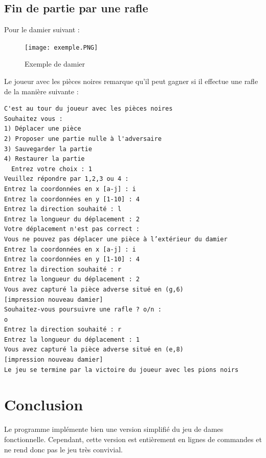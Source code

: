 \documentclass{article}
\begin{document}
\subsection{Fin de partie par une rafle}
Pour le damier suivant :
\begin{figure}[H]
\begin{center}
\texttt{[image: exemple.PNG]}
\end{center}
\caption{Exemple de damier}
\label{Exemple de damier}
\end{figure}
Le joueur avec les pièces noires remarque qu'il peut gagner si il effectue une rafle de la manière suivante :
\begin{verbatim}
C'est au tour du joueur avec les pièces noires 
Souhaitez vous :
1) Déplacer une pièce 
2) Proposer une partie nulle à l'adversaire
3) Sauvegarder la partie 
4) Restaurer la partie
  Entrez votre choix : 1
Veuillez répondre par 1,2,3 ou 4 : 
Entrez la coordonnées en x [a-j] : i
Entrez la coordonnées en y [1-10] : 4
Entrez la direction souhaité : l
Entrez la longueur du déplacement : 2
Votre déplacement n'est pas correct : 
Vous ne pouvez pas déplacer une pièce à l’extérieur du damier
Entrez la coordonnées en x [a-j] : i
Entrez la coordonnées en y [1-10] : 4
Entrez la direction souhaité : r
Entrez la longueur du déplacement : 2
Vous avez capturé la pièce adverse situé en (g,6)
[impression nouveau damier]
Souhaitez-vous poursuivre une rafle ? o/n : 
o
Entrez la direction souhaité : r
Entrez la longueur du déplacement : 1
Vous avez capturé la pièce adverse situé en (e,8)
[impression nouveau damier]  
Le jeu se termine par la victoire du joueur avec les pions noirs
\end{verbatim}

\section{Conclusion}

Le programme implémente bien une version simplifié du jeu de dames fonctionnelle. Cependant, cette version est entièrement en lignes de commandes et ne rend donc pas le jeu très convivial.
\end{document}
